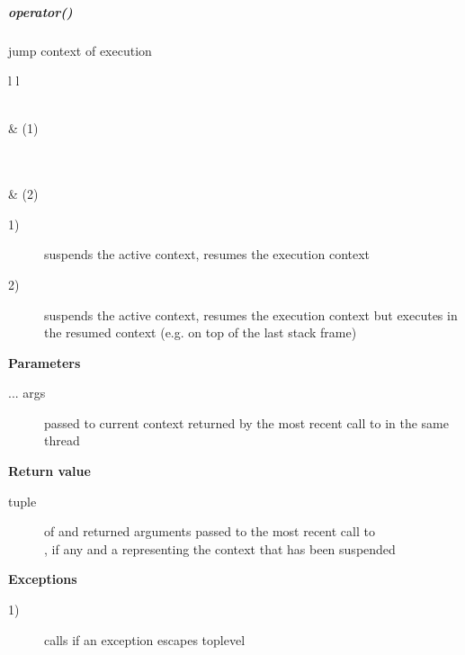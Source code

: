 \subparagraph*{operator()}
jump context of execution\\

\begin{tabular}{ l l }
    \midrule

    \\
     & (1)\\

    \midrule

    \\
    \\
     & (2)\\

    \midrule
\end{tabular}

\begin{description}
    \item[1)] suspends the active context, resumes the execution context
    \item[2)] suspends the active context, resumes the execution context but
        executes  in the resumed context (e.g. on top of the
        last stack frame)
\end{description}

{\bfseries Parameters}
\begin{description}
    \item[... args] passed to current context  returned by the most recent call
                    to  in the same thread\\
\end{description}

{\bfseries Return value}
\begin{description}
    \item[tuple]    of  and returned arguments passed to
                    the most recent call to\\ ,
                    if any and a  representing the
                    context that has been suspended\\
\end{description}

{\bfseries Exceptions}
\begin{description}
    \item[1)] calls  if an exception escapes toplevel \\
\end{description}

